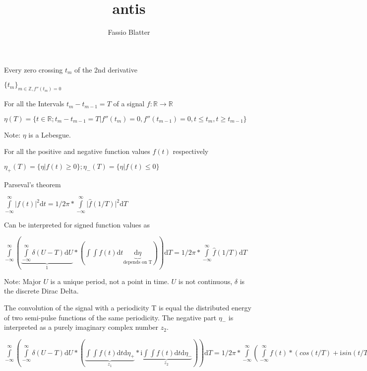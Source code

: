 \documentclass{article}
\renewcommand{\baselinestretch}{2}
\begin{document}
\title{antis}
\author{Fassio Blatter}

\maketitle


\renewcommand{\baselinestretch}{2}

Every zero crossing $t_{m}$ of the 2nd derivative

$\{t_{m}\}_{m \in \mathbb{Z} , f''(t_{m})=0}$

For all the Intervals $t_{m}-t_{m-1}=T$ of a signal $f: \mathbb{R} \rightarrow \mathbb{R}$

$\eta(T)=\{t \in \mathbb{R}; t_{m} - t_{m-1}=T \vert f''(t_{m})=0, f''(t_{m-1})=0, t \le t_{m}, t \ge t_{m-1} \}$

Note: $\eta$ is a Lebesgue.

For all the positive and negative function values $f(t)$ respectively

$\eta_{+}(T)=\{{\eta \vert f(t) \ge 0}\}; \eta_{-}(T)=\{{\eta \vert f(t) \le 0}\}$

Parseval's theorem

$\int\limits_{-\infty}^{\infty} \vert f(t) \vert ^2 \mathrm{d} t = 1/2\pi * \int\limits_{-\infty}^{\infty} \vert \hat{f}(1/T) \vert ^2  \mathrm{d} T$

Can be interpreted for signed function values as

$\int\limits_{-\infty}^{\infty} (\underbrace{\int\limits_{-\infty}^{\infty} \delta (U - T) \mathrm{d} U}_{1} * (\int\int f(t) \mathrm{d} t \underbrace{\mathrm{d} \eta}_{\text{depends on T}}) )\mathrm{d} T = 1/2\pi * \int\limits_{-\infty}^{\infty} \hat{f}(1/T) \mathrm{d} T$

Note: Major $U$ is a unique period, not a point in time. $U$ is not continuous, $\delta$ is the discrete Dirac Delta.

The convolution of the signal with a periodicity T is equal the distributed energy of two semi-pulse functions of the same periodicity. The negative part $\eta_{-}$ is interpreted as a purely imaginary complex number $z_{2}$.

$\int\limits_{-\infty}^{\infty}(\int\limits_{-\infty}^{\infty} \delta (U - T) \mathrm{d} U * (\underbrace{\int \int f(t) \mathrm{d} t \mathrm{d} \eta_{+}}_{z_{1}} * \underbrace{\mathrm{i} \int \int f(t) \mathrm{d} t \mathrm{d} \eta_{-}}_{z_{2}}))  \mathrm{d} T = 1/2\pi * \int\limits_{-\infty}^{\infty} ( \int\limits_{-\infty}^{\infty}  f(t) * (cos(t/T)+\mathrm{i} sin(t/T)) \mathrm{d} t ) \mathrm{d} T$
\end{document}
